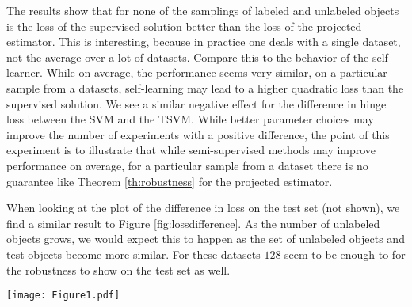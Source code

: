\documentclass{article}
\begin{document}
The results show that for none of the samplings of labeled and unlabeled objects is the loss of the supervised solution better than the loss of the projected estimator. This is interesting, because in practice one deals with a single dataset, not the average over a lot of datasets. Compare this to the behavior of the self-learner. While on average, the performance seems very similar, on a particular sample from a datasets, self-learning may lead to a higher quadratic loss than the supervised solution. We see a similar negative effect for the difference in hinge loss between the SVM and the TSVM. While better parameter choices may improve the number of experiments with a positive difference, the point of this experiment is to illustrate that while semi-supervised methods may improve performance on average, for a particular sample from a dataset there is no guarantee like Theorem \ref{th:robustness} for the projected estimator.

When looking at the plot of the difference in loss on the test set (not shown), we find a similar result to Figure \ref{fig:lossdifference}. As the number of unlabeled objects grows, we would expect this to happen as the set of unlabeled objects and test objects become more similar. For these datasets $128$ seem to be enough to for the robustness to show on the test set as well.

\begin{figure*}
\centering
\texttt{[image: Figure1.pdf]}
\caption{Difference in terms of average surrogate loss between the supervised and unsupervised solution measured on the labeled and unlabeled instances. Positive values indicate that the semi-supervised method gives a lower surrogate loss than its supervised counterpart. For both the projection estimator and self-learning this supervised counterpart is the least squares classifier and loss is in terms of quadratic loss. For the TSVM, the loss considered is hinge loss and the supervised counterpart is the SVM with the same cost parameter. Note that the figure is zoomed in on the area of interest around a loss difference of $0$ and there are observations that are outside of the figure. For the projection method considered here, the supervised solution never has lower loss than the semi-supervised solution, as was proven in Theorem \ref{th:robustness}. While the other methods may perform as well or better on average, they do not have a similar guarantee for a single sample from a dataset.}
\label{fig:lossdifference}
\end{figure*}
\end{document}
